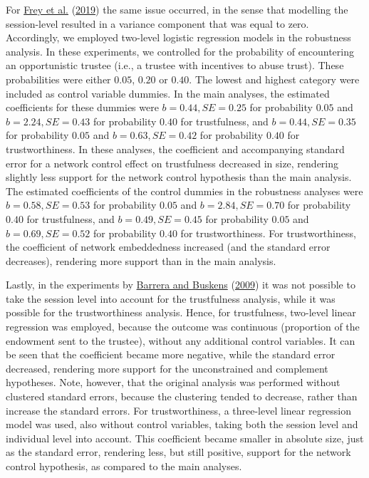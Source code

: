 \documentclass[
  11pt,
]{article}
\begin{document}
For \protect\hyperlink{ref-frey_buskens_investments_2019}{Frey et al.} (\protect\hyperlink{ref-frey_buskens_investments_2019}{2019}) the same issue occurred, in the sense that modelling the session-level resulted in a variance component that was equal to zero.
Accordingly, we employed two-level logistic regression models in the robustness analysis.
In these experiments, we controlled for the probability of encountering an opportunistic trustee (i.e., a trustee with incentives to abuse trust).
These probabilities were either \(0.05\), \(0.20\) or \(0.40\). The lowest and highest category were included as control variable dummies.
In the main analyses, the estimated coefficients for these dummies were \(b = 0.44, SE = 0.25\) for probability \(0.05\) and \(b = 2.24, SE = 0.43\) for probability \(0.40\) for trustfulness, and \(b = 0.44, SE = 0.35\) for probability \(0.05\) and \(b = 0.63, SE = 0.42\) for probability \(0.40\) for trustworthiness.
In these analyses, the coefficient and accompanying standard error for a network control effect on trustfulness decreased in size, rendering slightly less support for the network control hypothesis than the main analysis.
The estimated coefficients of the control dummies in the robustness analyses were \(b = 0.58, SE = 0.53\) for probability \(0.05\) and \(b = 2.84, SE = 0.70\) for probability \(0.40\) for trustfulness, and \(b = 0.49, SE = 0.45\) for probability \(0.05\) and \(b = 0.69, SE = 0.52\) for probability \(0.40\) for trustworthiness.
For trustworthiness, the coefficient of network embeddedness increased (and the standard error decreases), rendering more support than in the main analysis.

Lastly, in the experiments by \protect\hyperlink{ref-barrera_buskens_third_2009}{Barrera and Buskens} (\protect\hyperlink{ref-barrera_buskens_third_2009}{2009}) it was not possible to take the session level into account for the trustfulness analysis, while it was possible for the trustworthiness analysis.
Hence, for trustfulness, two-level linear regression was employed, because the outcome was continuous (proportion of the endowment sent to the trustee), without any additional control variables.
It can be seen that the coefficient became more negative, while the standard error decreased, rendering more support for the unconstrained and complement hypotheses.
Note, however, that the original analysis was performed without clustered standard errors, because the clustering tended to decrease, rather than increase the standard errors.
For trustworthiness, a three-level linear regression model was used, also without control variables, taking both the session level and individual level into account.
This coefficient became smaller in absolute size, just as the standard error, rendering less, but still positive, support for the network control hypothesis, as compared to the main analyses.
\end{document}
